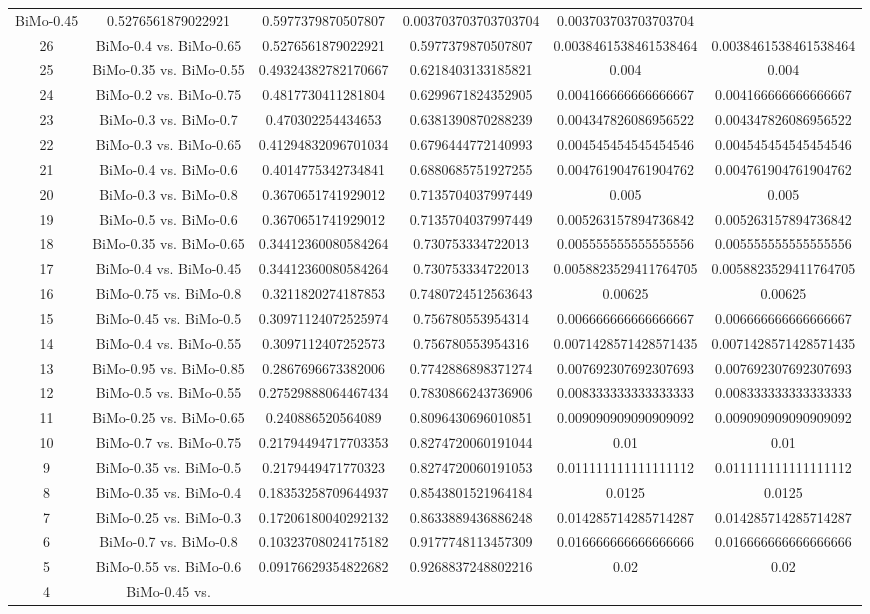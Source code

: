 \documentclass[a4paper,10pt]{article}
\begin{document}
\begin{landscape}
\begin{table}[!htp]
\begin{tabular}{cccccc}
BiMo-0.45&0.5276561879022921&0.5977379870507807&0.003703703703703704&0.003703703703703704\\26&BiMo-0.4 vs. BiMo-0.65&0.5276561879022921&0.5977379870507807&0.0038461538461538464&0.0038461538461538464\\25&BiMo-0.35 vs. BiMo-0.55&0.49324382782170667&0.6218403133185821&0.004&0.004\\24&BiMo-0.2 vs. BiMo-0.75&0.4817730411281804&0.6299671824352905&0.004166666666666667&0.004166666666666667\\23&BiMo-0.3 vs. BiMo-0.7&0.470302254434653&0.6381390870288239&0.004347826086956522&0.004347826086956522\\22&BiMo-0.3 vs. BiMo-0.65&0.41294832096701034&0.6796444772140993&0.004545454545454546&0.004545454545454546\\21&BiMo-0.4 vs. BiMo-0.6&0.4014775342734841&0.6880685751927255&0.004761904761904762&0.004761904761904762\\20&BiMo-0.3 vs. BiMo-0.8&0.3670651741929012&0.7135704037997449&0.005&0.005\\19&BiMo-0.5 vs. BiMo-0.6&0.3670651741929012&0.7135704037997449&0.005263157894736842&0.005263157894736842\\18&BiMo-0.35 vs. BiMo-0.65&0.34412360080584264&0.730753334722013&0.005555555555555556&0.005555555555555556\\17&BiMo-0.4 vs. BiMo-0.45&0.34412360080584264&0.730753334722013&0.0058823529411764705&0.0058823529411764705\\16&BiMo-0.75 vs. BiMo-0.8&0.3211820274187853&0.7480724512563643&0.00625&0.00625\\15&BiMo-0.45 vs. BiMo-0.5&0.30971124072525974&0.756780553954314&0.006666666666666667&0.006666666666666667\\14&BiMo-0.4 vs. BiMo-0.55&0.3097112407252573&0.756780553954316&0.0071428571428571435&0.0071428571428571435\\13&BiMo-0.95 vs. BiMo-0.85&0.2867696673382006&0.7742886898371274&0.007692307692307693&0.007692307692307693\\12&BiMo-0.5 vs. BiMo-0.55&0.27529888064467434&0.7830866243736906&0.008333333333333333&0.008333333333333333\\11&BiMo-0.25 vs. BiMo-0.65&0.240886520564089&0.8096430696010851&0.009090909090909092&0.009090909090909092\\10&BiMo-0.7 vs. BiMo-0.75&0.21794494717703353&0.8274720060191044&0.01&0.01\\9&BiMo-0.35 vs. BiMo-0.5&0.2179449471770323&0.8274720060191053&0.011111111111111112&0.011111111111111112\\8&BiMo-0.35 vs. BiMo-0.4&0.18353258709644937&0.8543801521964184&0.0125&0.0125\\7&BiMo-0.25 vs. BiMo-0.3&0.17206180040292132&0.8633889436886248&0.014285714285714287&0.014285714285714287\\6&BiMo-0.7 vs. BiMo-0.8&0.10323708024175182&0.9177748113457309&0.016666666666666666&0.016666666666666666\\5&BiMo-0.55 vs. BiMo-0.6&0.09176629354822682&0.9268837248802216&0.02&0.02\\4&BiMo-0.45 vs. 
\end{tabular}
\end{table}
\end{landscape}
\end{document}

